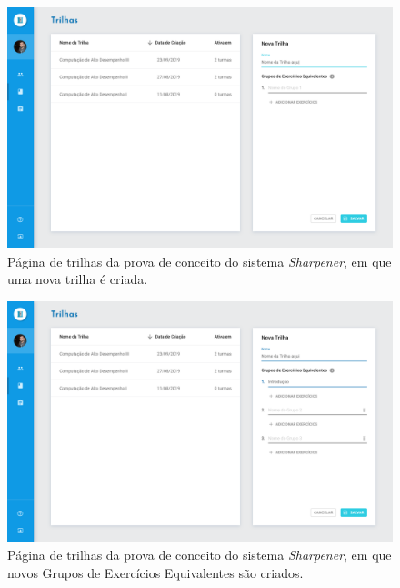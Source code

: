     \begin{figure}[htpb]
  \centering
  \includegraphics[width=\linewidth]{images/mocks/trackAdd1.png}
  \caption{Página de trilhas da prova de conceito do sistema \emph{Sharpener}, 
  em que uma nova trilha é criada.}%
  \label{fig:add_track1}
  \end{figure}
  
    \begin{figure}[htpb]
  \centering
  \includegraphics[width=\linewidth]{images/mocks/trackAdd2.png}
  \caption{Página de trilhas da prova de conceito do sistema \emph{Sharpener}, 
  em que novos Grupos de Exercícios Equivalentes são criados.}%
  \label{fig:add_track2}
  \end{figure}

